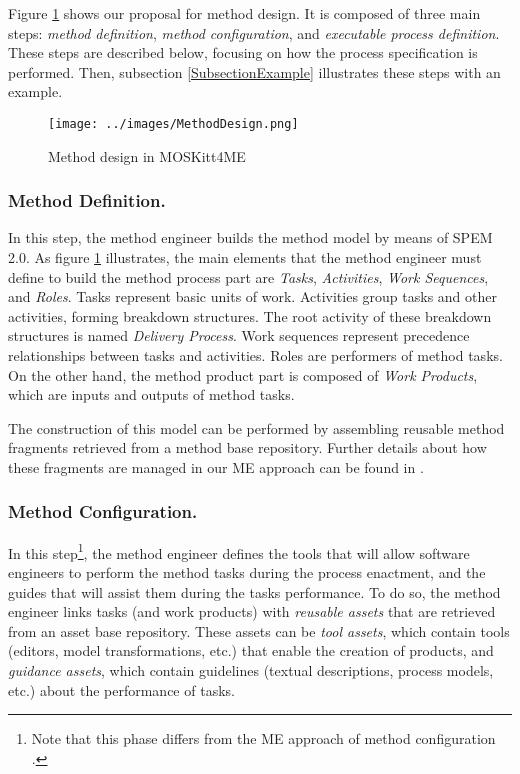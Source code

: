 \documentclass[runningheads,a4paper]{llncs}
\begin{document}
Figure \ref{FigureMethodDesign} shows our proposal for method design. It is
composed of three main steps: \textit{method definition}, \textit{method configuration}, and
\textit{executable process definition}. These steps are described below,
focusing on how the process specification is performed. Then, subsection
\ref{SubsectionExample} illustrates these steps with an example.

\begin{figure}
\centering
\texttt{[image: ../images/MethodDesign.png]}
\caption{Method design in MOSKitt4ME}
\label{FigureMethodDesign}
\end{figure}

\subsubsection{Method Definition.}

In this step, the method engineer builds the method model by means of SPEM
2.0. As figure \ref{FigureMethodDesign} illustrates, the main elements
that the method engineer must define to build the method process part
are \textit{Tasks}, \textit{Activities}, \textit{Work Sequences}, and
\textit{Roles}. Tasks represent basic units of work. Activities group tasks and
other activities, forming breakdown structures. The root activity of these
breakdown structures is named \textit{Delivery Process}. Work
sequences represent precedence relationships between tasks and activities. Roles
are performers of method tasks. On the other hand, the method product part is
composed of \textit{Work Products}, which are inputs and outputs of method
tasks.

The construction of this model can be performed by assembling reusable method
fragments retrieved from a method base repository. Further details about how
these fragments are managed in our ME approach can be found in
\cite{Cervera10,Cervera11}.

\subsubsection{Method Configuration.}

In this step\footnote{Note that this phase differs from the ME approach of
method configuration \cite{Karlsson04}.}, the method engineer defines the tools
that will allow software engineers to perform the method tasks during the
process enactment, and the guides that will assist them during the tasks
performance. To do so, the method engineer links tasks (and work products) with
\textit{reusable assets} that are retrieved from an asset base repository. These
assets can be \textit{tool assets}, which contain tools (editors, model
transformations, etc.) that enable the creation of products, and
\textit{guidance assets}, which contain guidelines (textual descriptions,
process models, etc.) about the performance of tasks.
\end{document}
